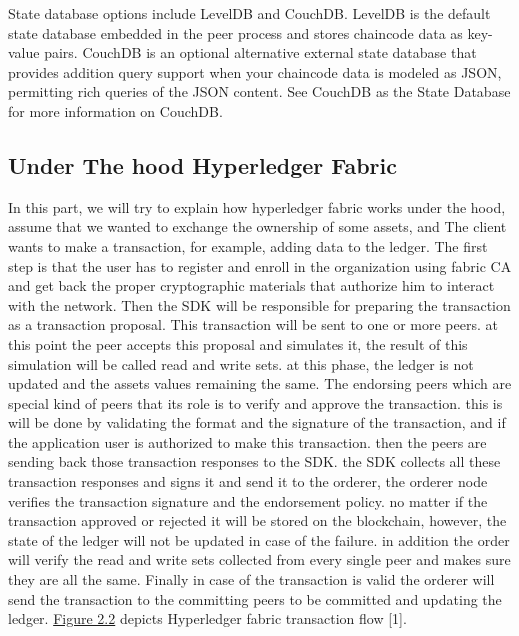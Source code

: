 State database options include LevelDB and CouchDB. LevelDB is the default state database embedded in the peer process and stores chaincode data as key-value pairs. CouchDB is an optional alternative external state database that provides addition query support when your chaincode data is modeled as JSON, permitting rich queries of the JSON content. See CouchDB as the State Database for more information on CouchDB.


\cleardoublepage

\subsection{Under The hood Hyperledger Fabric }

In this part, we will try to explain how hyperledger fabric works under the hood,
assume that we wanted to exchange the ownership of some assets, and The client wants to make a transaction, for example, adding data to the ledger. 
The first step is that the user has to register and enroll in the organization using fabric CA and get back the proper cryptographic materials that authorize him to interact with the network. Then the SDK will be responsible for preparing the transaction as a transaction proposal. This transaction will be sent to one or more peers. 
at this point the peer accepts this proposal and simulates it, the result of this simulation will be called read and write sets. at this phase, the ledger is not updated and the assets values remaining the same. 
The endorsing peers which are special kind of peers that its role is to verify and approve the transaction. this is will be done by validating the format and the signature of the transaction, and if the application user is authorized to make this transaction. 
then the peers are sending back those transaction responses to the SDK. the SDK collects all these transaction responses and signs it and send it to the orderer, the orderer node verifies the transaction signature and the endorsement policy. no matter if the transaction approved or rejected it will be stored on the blockchain, however, the state of the ledger will not be updated in case of the failure. in addition the order will verify the read and write sets collected from every single peer and makes sure they are all the same. 
Finally in case of the transaction is valid the orderer will send the transaction to the committing peers to be committed and updating the ledger.
\hyperref[fig:transactionflow]{Figure 2.2} depicts Hyperledger fabric transaction flow [1]. 
